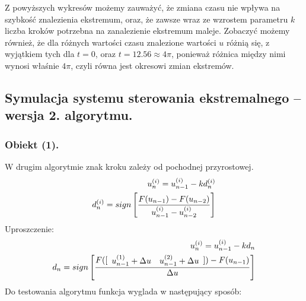 \documentclass[a4paper,10pt]{article}
\begin{document}
\newpage Z powyższych wykresów możemy zauważyć, że zmiana czasu nie wpływa na szybkość znalezienia ekstremum, oraz, że zawsze wraz ze wzrostem parametru $k$ liczba kroków potrzebna na zanalezienie ekstremum maleje. Zobaczyć możemy również, że dla różnych wartości czasu znalezione wartości $u$ różnią się, z wyjątkiem tych dla $t=0$, oraz $t=12.56 \approx 4\pi$, ponieważ różnica między nimi wynosi właśnie $4\pi$, czyli równa jest okresowi zmian ekstremów.

\subsection{Symulacja systemu sterowania ekstremalnego – wersja 2. algorytmu.}
\subsubsection{Obiekt (1).}
W drugim algorytmie znak kroku zależy od pochodnej przyrostowej.
\begin{eqnarray}
	u_n^{(i)} = u_{n-1}^{(i)}-kd_n^{(i)}\\
	d_n^{(i)} = sign \left[ {F(u_{n-1}) - F(u_{n-2}) \over u_{n-1}^{(i)} - u_{n-2}^{(i)}} \right] 
\end{eqnarray}
Uproszczenie:
\begin{eqnarray}
	u_n^{(i)} = u_{n-1}^{(i)}-kd_n\\
	d_n = sign \left[ {F([\begin{array}{ll} u_{n-1}^{(1)} + \Delta u & u_{n-1}^{(2)} + \Delta u\end{array}]) - F(u_{n-1}) \over \Delta u}\right] 
\end{eqnarray}
Do testowania algorytmu funkcja wyglada w następujący sposób:


\end{document}
